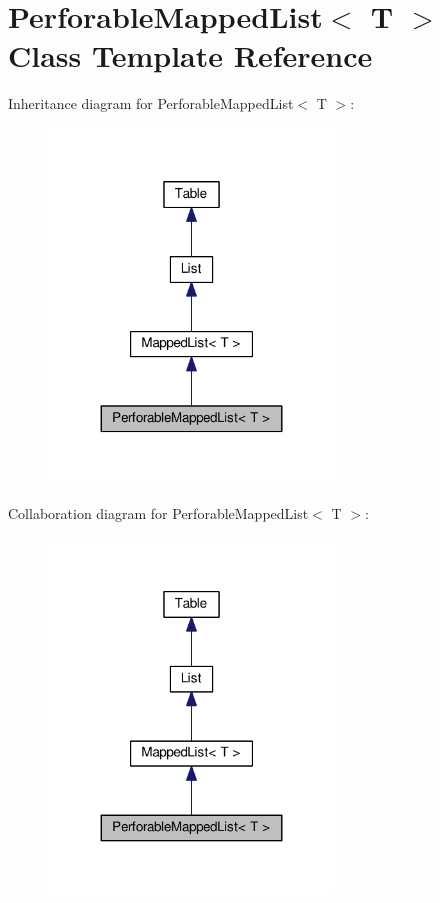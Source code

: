 \hypertarget{classPerforableMappedList}{}\section{Perforable\+Mapped\+List$<$ T $>$ Class Template Reference}
\label{classPerforableMappedList}


Inheritance diagram for Perforable\+Mapped\+List$<$ T $>$\+:\nopagebreak
\begin{figure}[H]
\begin{center}
\leavevmode
\includegraphics[width=215pt]{classPerforableMappedList__inherit__graph}
\end{center}
\end{figure}


Collaboration diagram for Perforable\+Mapped\+List$<$ T $>$\+:\nopagebreak
\begin{figure}[H]
\begin{center}
\leavevmode
\includegraphics[width=215pt]{classPerforableMappedList__coll__graph}
\end{center}
\end{figure}
